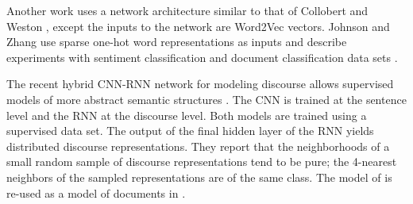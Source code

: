 Another work uses a network architecture similar to that of Collobert and
Weston \cite{Kim2014-vy}, except the inputs to the network are Word2Vec
vectors.  Johnson and Zhang use sparse one-hot word representations
as inputs and describe experiments with sentiment classification and
document classification data sets \cite{Johnson2014-ol}.

The recent hybrid CNN-RNN network for modeling discourse allows supervised
models of more abstract semantic structures \cite{Kalchbrenner2013-kz}.
The CNN is trained at the sentence level and the RNN at the discourse
level.  Both models are trained using a supervised data set.
The output of the final hidden layer of the RNN yields distributed
discourse representations.  They report that the neighborhoods of a
small random sample of discourse representations tend to be pure; the
4-nearest neighbors of the sampled representations are of the same class.
The model of \cite{Kalchbrenner2014-tl} is re-used as a model of documents
in \cite{Denil2014-dx}.
